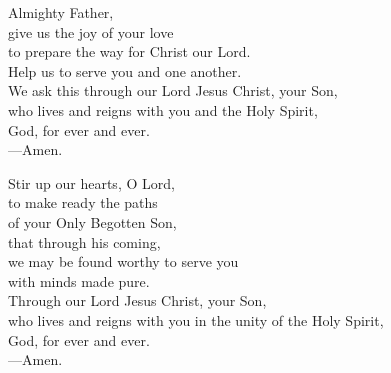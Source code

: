 \prayer


\begin{prayerverse}
Almighty Father,\\
give us the joy of your love\\
to prepare the way for Christ our Lord.\\
Help us to serve you and one another.\\
We ask this through our Lord Jesus Christ, your Son,\\
who lives and reigns with you and the Holy Spirit,\\
God, for ever and ever.\\
{\color{red}---\thinspace}Amen.
\end{prayerverse}


\begin{prayerverse}
Stir up our hearts, O Lord,\\
to make ready the paths\\
of your Only Begotten Son,\\
that through his coming,\\
we may be found worthy to serve you\\
with minds made pure.\\
Through our Lord Jesus Christ, your Son,\\
who lives and reigns with you in the unity of the Holy Spirit,\\
God, for ever and ever.\\
{\color{red}---\thinspace}Amen.
\end{prayerverse}

